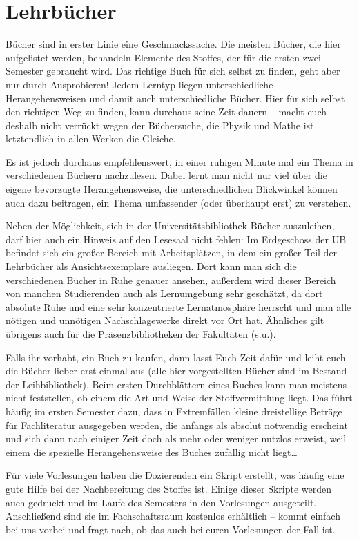 \section{Lehrbücher}

Bücher sind in erster Linie eine Geschmackssache. Die meisten Bücher, die hier aufgelistet werden, behandeln Elemente des Stoffes, der für die ersten zwei Semester gebraucht wird. Das richtige Buch für sich selbst zu finden, geht aber nur durch Ausprobieren! Jedem Lerntyp liegen unterschiedliche Herangehensweisen und damit auch unterschiedliche Bücher. Hier für sich selbst den richtigen Weg zu finden, kann durchaus seine Zeit dauern -- macht euch deshalb nicht verrückt wegen der Büchersuche, die Physik und Mathe ist letztendlich in allen Werken die Gleiche.

Es ist jedoch durchaus empfehlenswert, in einer ruhigen Minute mal ein Thema in verschiedenen Büchern nachzulesen. Dabei lernt man nicht nur viel über die eigene bevorzugte Herangehensweise, die unterschiedlichen Blickwinkel können auch dazu beitragen, ein Thema umfassender (oder überhaupt erst) zu verstehen.

Neben der Möglichkeit, sich in der Universitätsbibliothek Bücher auszuleihen, darf hier auch ein Hinweis auf den Lesesaal nicht fehlen: Im Erdgeschoss der UB befindet sich ein großer Bereich mit Arbeitsplätzen, in dem ein großer Teil der Lehrbücher als Ansichtsexemplare ausliegen. Dort kann man sich die verschiedenen Bücher in Ruhe genauer ansehen, außerdem wird dieser Bereich von manchen Studierenden auch als Lernumgebung sehr geschätzt, da dort absolute Ruhe und eine sehr konzentrierte Lernatmosphäre herrscht und man alle nötigen und unnötigen Nachschlagewerke direkt vor Ort hat. Ähnliches gilt übrigens auch für die Präsenzbibliotheken der Fakultäten (s.u.).

Falls ihr vorhabt, ein Buch zu kaufen, dann lasst Euch Zeit dafür und leiht euch die Bücher lieber erst einmal aus (alle hier vorgestellten Bücher sind im Bestand der Leihbibliothek). Beim ersten Durchblättern eines Buches kann man meistens nicht feststellen, ob einem die Art und Weise der Stoffvermittlung liegt. Das führt häufig im ersten Semester dazu, dass in Extremfällen kleine dreistellige Beträge für Fachliteratur ausgegeben werden, die anfangs als absolut notwendig erscheint und sich dann nach einiger Zeit doch als mehr oder weniger nutzlos erweist, weil einem die spezielle Herangehensweise des Buches zufällig nicht liegt\dots

Für viele Vorlesungen haben die Dozierenden ein Skript erstellt, was häufig eine gute Hilfe bei der Nachbereitung des Stoffes ist. Einige dieser Skripte werden auch gedruckt und im Laufe des Semesters in den Vorlesungen ausgeteilt. Anschließend sind sie im Fachschaftsraum kostenlos erhältlich -- kommt einfach bei uns vorbei und fragt nach, ob das auch bei euren Vorlesungen der Fall ist.


